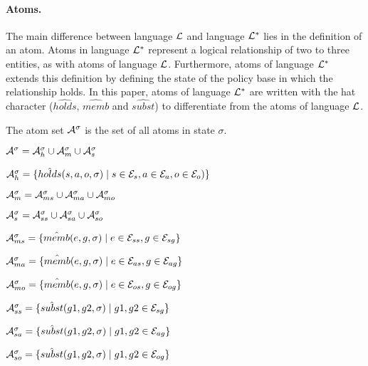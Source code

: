 \documentclass[11pt, twocolumn]{article}
\newenvironment{vquote}
  {\begin{list}{}{\leftmargin 1em}\item[]}
  {\end{list}}
\begin{document}
        \paragraph{Atoms.}

          The main difference between language ${\cal L}$ and language
          ${\cal L}^{*}$ lies in the definition of an atom. Atoms in language
          ${\cal L}^{*}$ represent a logical relationship of two to three
          entities, as with atoms of language ${\cal L}$. Furthermore, atoms of
          language ${\cal L}^{*}$ extends this definition by defining the
          state of the policy base in which the relationship holds. In this
          paper, atoms of language ${\cal L}^{*}$ are written with the
          hat character ($\hat{holds}$, $\hat{memb}$ and $\hat{subst}$) to
          differentiate from the atoms of language ${\cal L}$.

          The atom set ${\cal A}^{\sigma}$ is the set of all atoms in state
          $\sigma$.

          \begin{vquote}
            ${\cal A}^{\sigma} = {\cal A}^{\sigma}_{h} \cup {\cal A}^{\sigma}_{m} \cup {\cal A}^{\sigma}_{s}$

            ${\cal A}^{\sigma}_{h} = \{\hat{holds}(s, a, o, \sigma) \mid s \in {\cal E}_{s}, a \in {\cal E}_{a}, o \in {\cal E}_{o})\}$

            ${\cal A}^{\sigma}_{m} = {\cal A}^{\sigma}_{ms} \cup {\cal A}^{\sigma}_{ma} \cup {\cal A}^{\sigma}_{mo}$

            ${\cal A}^{\sigma}_{s} = {\cal A}^{\sigma}_{ss} \cup {\cal A}^{\sigma}_{sa} \cup {\cal A}^{\sigma}_{so}$

            ${\cal A}^{\sigma}_{ms} = \{\hat{memb}(e, g, \sigma) \mid e \in {\cal E}_{ss}, g \in {\cal E}_{sg}\}$

            ${\cal A}^{\sigma}_{ma} = \{\hat{memb}(e, g, \sigma) \mid e \in {\cal E}_{as}, g \in {\cal E}_{ag}\}$

            ${\cal A}^{\sigma}_{mo} = \{\hat{memb}(e, g, \sigma) \mid e \in {\cal E}_{os}, g \in {\cal E}_{og}\}$

            ${\cal A}^{\sigma}_{ss} = \{\hat{subst}(g1, g2, \sigma) \mid g1, g2 \in {\cal E}_{sg}\}$

            ${\cal A}^{\sigma}_{sa} = \{\hat{subst}(g1, g2, \sigma) \mid g1, g2 \in {\cal E}_{ag}\}$

            ${\cal A}^{\sigma}_{so} = \{\hat{subst}(g1, g2, \sigma) \mid g1, g2 \in {\cal E}_{og}\}$
          \end{vquote}
\end{document}
